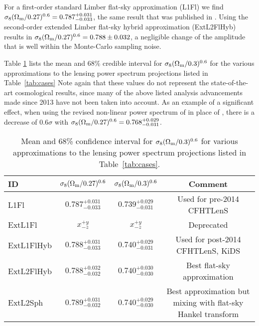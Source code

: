 For a first-order standard Limber flat-sky approximation (L1Fl) we find
$\sigma_8 (\Omega_{\rm m}/0.27)^{0.6} =0.787^{+0.031}_{-0.033}$, the same
result that was published in \cite{CFHTLenS-2pt-notomo}. Using the second-order
extended Limber flat-sky hybrid approximation (ExtL2FlHyb) results in
$\sigma_8 (\Omega_{\rm m}/0.27)^{0.6} = 0.788 \pm 0.032$, a negligible
change of the amplitude that is well within the Monte-Carlo sampling noise. 

Table \ref{tab:CFHTLenS_Sigma8} lists the mean and 68\% credible interval for
$\sigma_8 (\Omega_{\rm m}/0.3)^{0.6}$ for the various approximations to the
lensing power spectrum projections listed in Table~\ref{tab:cases} Note again
that these values do not represent the state-of-the-art cosmological results,
since many of the above listed analysis advancements made since 2013 have not
been taken into account. As an example of a significant effect, when using the
revised non-linear power spectrum of \cite{2012ApJ...761..152T} in place of
\cite{2003MNRAS.341.1311S}, there is a decrease of $0.6 \sigma$ with $\sigma_8
(\Omega_{\rm m}/0.27)^{0.6} =0.768^{+0.029}_{-0.031}$.


\renewcommand{\baselinestretch}{1.5}
\begin{table}
\begin{centering}
  
  \caption{\label{tab:CFHTLenS_Sigma8}Mean and 68\% confidence interval for 
  $\sigma_8 (\Omega_{\rm m}/0.3)^{0.6}$ for various approximations to the lensing
  power spectrum projections listed in Table~\ref{tab:cases}.}

  \begin{tabular}{lccc} \hline
  ID         & $\sigma_8 (\Omega_{\rm m}/0.27)^{0.6}$ & $\sigma_8 (\Omega_{\rm m}/0.3)^{0.6}$ & Comment \\ \hline
  L1Fl       & $0.787^{+0.031}_{-0.033}$ & $0.739^{+0.029}_{-0.031}$ & Used for pre-2014 CFHTLenS \\
  ExtL1Fl    & $x^{+y}_{-z}$ & $x^{+y}_{-z}$ & Deprecated \\
  ExtL1FlHyb & $0.788^{+0.031}_{-0.033}$ & $0.740^{+0.029}_{-0.031}$ & Used for post-2014 CFHTLenS, KiDS \\
  ExtL2FlHyb & $0.788^{+0.032}_{-0.032}$ & $0.740^{+0.030}_{-0.030}$ & Best flat-sky approximation \\
  ExtL2Sph   & $0.789^{+0.031}_{-0.032}$ & $0.740^{+0.029}_{-0.030}$ & Best approximation but mixing with flat-sky Hankel transform \\ \hline
  \end{tabular}

\end{centering}
\end{table}
\renewcommand{\baselinestretch}{1}


